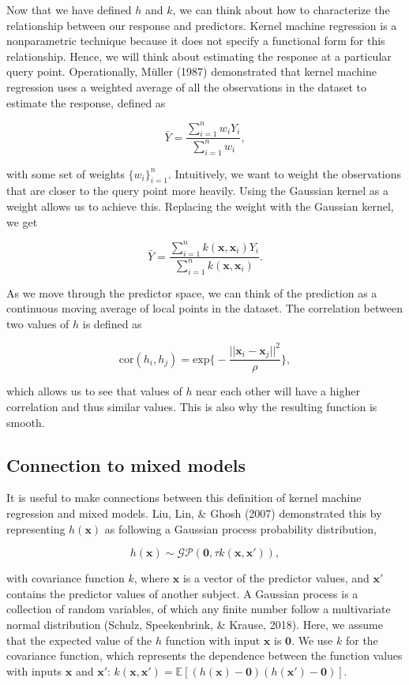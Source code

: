 \documentclass[12pt, twoside]{amherstthesis}
\begin{document}
Now that we have defined \(h\) and \(k\), we can think about how to characterize the relationship between our response and predictors. Kernel machine regression is a nonparametric technique because it does not specify a functional form for this relationship. Hence, we will think about estimating the response at a particular query point. Operationally, Müller (1987) demonstrated that kernel machine regression uses a weighted average of all the observations in the dataset to estimate the response, defined as

\[
\bar{Y} = \frac{\sum_{i=1}^nw_iY_i}{\sum_{i=1}^nw_i},
\]

\noindent with some set of weights \(\{w_i\}_{i=1}^n\). Intuitively, we want to weight the observations that are closer to the query point more heavily. Using the Gaussian kernel as a weight allows us to achieve this. Replacing the weight with the Gaussian kernel, we get

\[
\bar{Y} = \frac{\sum_{i=1}^n k(\textbf{x}, \textbf{x}_i) Y_i}
{\sum_{i=1}^n k(\textbf{x}, \textbf{x}_i)}.
\]

As we move through the predictor space, we can think of the prediction as a continuous moving average of local points in the dataset. The correlation between two values of \(h\) is defined as

\[
\textrm{cor}(h_i, h_j) = \textrm{exp} \bigg\{-\frac{||
\textbf{x}_{i}-\textbf{x}_{j}||^2}{\rho} \bigg\},
\]

\noindent which allows us to see that values of \(h\) near each other will have a higher correlation and thus similar values. This is also why the resulting function is smooth.

\hypertarget{connection-to-mixed-models}{%
\subsection{Connection to mixed models}\label{connection-to-mixed-models}}

It is useful to make connections between this definition of kernel machine regression and mixed models. Liu, Lin, \& Ghosh (2007) demonstrated this by representing \(h(\textbf{x})\) as following a Gaussian process probability distribution,

\[
h(\textbf{x}) \sim \mathcal{GP}(\textbf{0}, \tau k(\textbf{x}, \textbf{x}')),
\]

\noindent with covariance function \(k\), where \(\textbf{x}\) is a vector of the predictor values, and \(\textbf{x}'\) contains the predictor values of another subject. A Gaussian process is a collection of random variables, of which any finite number follow a multivariate normal distribution (Schulz, Speekenbrink, \& Krause, 2018). Here, we assume that the expected value of the \(h\) function with input \(\textbf{x}\) is \(\textbf{0}\). We use \(k\) for the covariance function, which represents the dependence between the function values with inputs \(\textbf{x}\) and \(\textbf{x}'\): \(k(\textbf{x}, \textbf{x}') = \mathbb{E}[(h(\textbf{x})- \textbf{0}) (h(\textbf{x}')- \textbf{0})]\).
\end{document}
